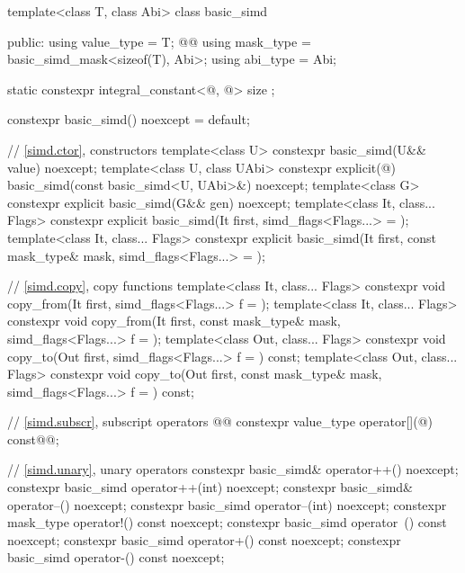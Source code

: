 \begin{codeblock}
template<class T, class Abi> class basic_simd {
public:
  using value_type = T;
  @@
  using mask_type = basic_simd_mask<sizeof(T), Abi>;
  using abi_type = Abi;

  static constexpr integral_constant<@\simdsizetype@, @> size {};

  constexpr basic_simd() noexcept = default;

  // \ref{simd.ctor},  constructors
  template<class U> constexpr basic_simd(U&& value) noexcept;
  template<class U, class UAbi>
    constexpr explicit(@\seebelow@) basic_simd(const basic_simd<U, UAbi>&) noexcept;
  template<class G> constexpr explicit basic_simd(G&& gen) noexcept;
  template<class It, class... Flags>
    constexpr explicit basic_simd(It first, simd_flags<Flags...> = {});
  template<class It, class... Flags>
    constexpr explicit basic_simd(It first, const mask_type& mask, simd_flags<Flags...> = {});

  // \ref{simd.copy},  copy functions
  template<class It, class... Flags>
    constexpr void copy_from(It first, simd_flags<Flags...> f = {});
  template<class It, class... Flags>
    constexpr void copy_from(It first, const mask_type& mask, simd_flags<Flags...> f = {});
  template<class Out, class... Flags>
    constexpr void copy_to(Out first, simd_flags<Flags...> f = {}) const;
  template<class Out, class... Flags>
    constexpr void copy_to(Out first, const mask_type& mask, simd_flags<Flags...> f = {}) const;

  // \ref{simd.subscr},  subscript operators
  @@
  constexpr value_type operator[](@\simdsizetype@) const@\wgRem{\&}@;

  // \ref{simd.unary},  unary operators
  constexpr basic_simd& operator++() noexcept;
  constexpr basic_simd operator++(int) noexcept;
  constexpr basic_simd& operator--() noexcept;
  constexpr basic_simd operator--(int) noexcept;
  constexpr mask_type operator!() const noexcept;
  constexpr basic_simd operator~() const noexcept;
  constexpr basic_simd operator+() const noexcept;
  constexpr basic_simd operator-() const noexcept;

}
\end{codeblock}

